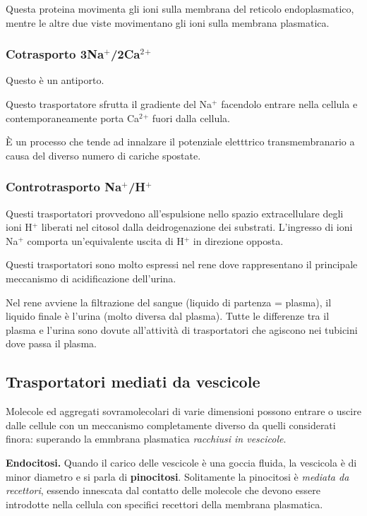 \documentclass[]{article}
\begin{document}
Questa proteina movimenta gli ioni sulla membrana del reticolo
endoplasmatico, mentre le altre due viste movimentano gli ioni sulla
membrana plasmatica.

\subsubsection{\texorpdfstring{Cotrasporto
3Na\(^+\)/2Ca\(^2\)\(^+\)}{Cotrasporto 3Na\^{}+/2Ca\^{}2\^{}+}}\label{cotrasporto-3na2ca2}

Questo è un antiporto.

Questo trasportatore sfrutta il gradiente del Na\(^+\) facendolo entrare
nella cellula e contemporaneamente porta Ca\(^2\)\(^+\) fuori dalla
cellula.

È un processo che tende ad innalzare il potenziale eletttrico
transmembranario a causa del diverso numero di cariche spostate.

\subsubsection{\texorpdfstring{Controtrasporto
Na\(^+\)/H\(^+\)}{Controtrasporto Na\^{}+/H\^{}+}}\label{controtrasporto-nah}

Questi trasportatori provvedono all'espulsione nello spazio
extracellulare degli ioni H\(^+\) liberati nel citosol dalla
deidrogenazione dei substrati. L'ingresso di ioni Na\(^+\) comporta
un'equivalente uscita di H\(^+\) in direzione opposta.

Questi trasportatori sono molto espressi nel rene dove rappresentano il
principale meccanismo di acidificazione dell'urina.

Nel rene avviene la filtrazione del sangue (liquido di partenza =
plasma), il liquido finale è l'urina (molto diversa dal plasma). Tutte
le differenze tra il plasma e l'urina sono dovute all'attività di
trasportatori che agiscono nei tubicini dove passa il plasma.

\subsection{Trasportatori mediati da
vescicole}\label{trasportatori-mediati-da-vescicole}

Molecole ed aggregati sovramolecolari di varie dimensioni possono
entrare o uscire dalle cellule con un meccanismo completamente diverso
da quelli considerati finora: superando la emmbrana plasmatica
\emph{racchiusi in vescicole}.

\textbf{Endocitosi.} Quando il carico delle vescicole è una goccia
fluida, la vescicola è di minor diametro e si parla di
\textbf{pinocitosi}. Solitamente la pinocitosi è \emph{mediata da
recettori}, essendo innescata dal contatto delle molecole che devono
essere introdotte nella cellula con specifici recettori della membrana
plasmatica.
\end{document}
